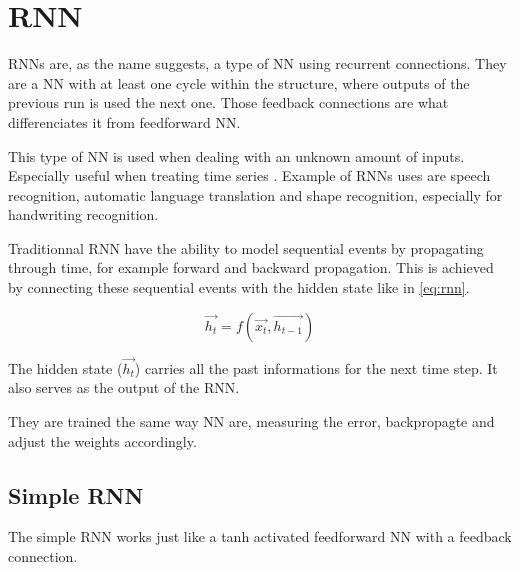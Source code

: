 \section{\acs{RNN}}\label{sec:rnn}

\acp{RNN} are, as the name suggests, a type of \ac{NN} using recurrent connections. They are a \ac{NN} with at least one cycle within the structure, where outputs of the previous run is used the next one. Those feedback connections are what differenciates it from feedforward \ac{NN}.

This type of \ac{NN} is used when dealing with an unknown amount of inputs. Especially useful when treating time series \cite{rnn}. Example of \acp{RNN} uses are speech recognition, automatic language translation \cite{gru} and shape recognition, especially for handwriting recognition.

Traditionnal \ac{RNN} have the ability to model sequential events by propagating through time, for example forward and backward propagation. This is achieved by connecting these sequential events with the hidden state like in \cref{eq:rnn}.

\begin{equation}\label{eq:rnn}
  \overrightarrow{h_t}=f(\overrightarrow{x_t},\overrightarrow{h_{t-1}})
\end{equation}

The hidden state ($\overrightarrow{h_t}$) carries all the past informations for the next time step. It also serves as the output of the \ac{RNN}.

They are trained the same way \ac{NN} are, measuring the error, backpropagte and adjust the weights accordingly.

\subsection{Simple \ac{RNN}}

The simple \ac{RNN} works just like a \ac{tanh} activated feedforward \ac{NN} with a feedback connection.

\begin{figure}[H]
  \centering
  \begin{minipage}{\columnwidth}
  \end{minipage}
  \begin{minipage}{\columnwidth}
  \end{minipage}
  \caption{}
\end{figure}

